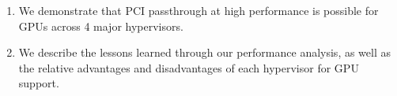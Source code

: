 \begin{enumerate}
\item We demonstrate that PCI passthrough at high performance is possible for
GPUs across 4 major hypervisors.
\item We describe the lessons learned through our performance analysis, as well as the relative advantages
and disadvantages of each hypervisor for GPU support.
\end{enumerate}









